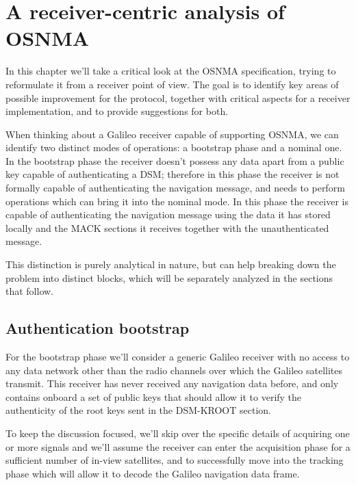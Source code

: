 \chapter{A receiver-centric analysis of OSNMA}
\label{ch:osnma_analysis}

In this chapter we'll take a critical look at the OSNMA specification, trying to
reformulate it from a receiver point of view. The goal is to identify key areas
of possible improvement for the protocol, together with critical aspects for a
receiver implementation, and to provide suggestions for both.

\vspace{\baselineskip}

When thinking about a Galileo receiver capable of supporting OSNMA, we can
identify two distinct modes of operations: a bootstrap phase and a nominal one.
In the bootstrap phase the receiver doesn't possess any data apart from a public
key capable of authenticating a DSM; therefore in this phase the receiver is not
formally capable of authenticating the navigation message, and needs to perform
operations which can bring it into the nominal mode. In this phase the receiver
is capable of authenticating the navigation message using the data it has stored
locally and the MACK sections it receives together with the unauthenticated
message.

This distinction is purely analytical in nature, but can help breaking down the
problem into distinct blocks, which will be separately analyzed in the sections
that follow.

\section{Authentication bootstrap}
For the bootstrap phase we'll consider a generic Galileo receiver with no access
to any data network other than the radio channels over which the Galileo
satellites transmit. This receiver has never received any navigation
data before, and only contains onboard a set of public keys that should allow it to
verify the authenticity of the root keys sent in the DSM-KROOT section.

To keep the discussion focused, we'll skip over the specific details of
acquiring one or more signals and we'll assume the receiver can enter the
acquisition phase for a sufficient number of in-view satellites, and to
successfully move into the tracking phase which will allow it to decode the
Galileo navigation data frame.

